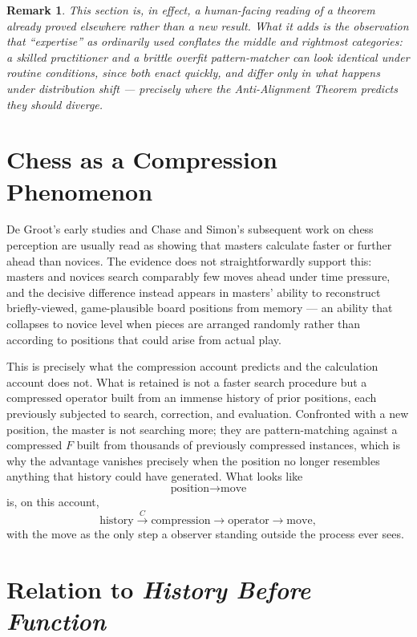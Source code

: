 \documentclass[11pt]{article}
\newtheorem*{remark}{Remark}
\begin{document}
\begin{remark}
This section is, in effect, a human-facing reading of a theorem already proved elsewhere rather than a new result. What it adds is the observation that ``expertise'' as ordinarily used conflates the middle and rightmost categories: a skilled practitioner and a brittle overfit pattern-matcher can look identical under routine conditions, since both enact quickly, and differ only in what happens under distribution shift — precisely where the Anti-Alignment Theorem predicts they should diverge.
\end{remark}

\section{Chess as a Compression Phenomenon}

De Groot's early studies and Chase and Simon's subsequent work on chess perception are usually read as showing that masters calculate faster or further ahead than novices. The evidence does not straightforwardly support this: masters and novices search comparably few moves ahead under time pressure, and the decisive difference instead appears in masters' ability to reconstruct briefly-viewed, game-plausible board positions from memory — an ability that collapses to novice level when pieces are arranged randomly rather than according to positions that could arise from actual play.

This is precisely what the compression account predicts and the calculation account does not. What is retained is not a faster search procedure but a compressed operator built from an immense history of prior positions, each previously subjected to search, correction, and evaluation. Confronted with a new position, the master is not searching more; they are pattern-matching against a compressed $F$ built from thousands of previously compressed instances, which is why the advantage vanishes precisely when the position no longer resembles anything that history could have generated. What looks like
\[
\text{position} \longrightarrow \text{move}
\]
is, on this account,
\[
\text{history} \xrightarrow{\;C\;} \text{compression} \longrightarrow \text{operator} \longrightarrow \text{move},
\]
with the move as the only step a observer standing outside the process ever sees.

\section{Relation to \emph{History Before Function}}
\end{document}
